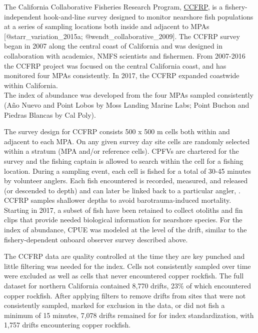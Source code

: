 \documentclass[11pt,
  letterpaper,
]{article}
\begin{document}
The California Collaborative Fisheries Research Program, \href{https://www.mlml.calstate.edu/ccfrp/}{CCFRP}, is a fishery-independent hook-and-line survey designed to monitor nearshore fish populations at a series of sampling locations both inside and adjacent to MPAs {[}@starr\_variation\_2015a; @wendt\_collaborative\_2009{]}. The CCFRP survey began in 2007 along the central coast of California and was designed in collaboration with academics, NMFS scientists and fishermen. From 2007-2016 the CCFRP project was focused on the central California coast, and has monitored four MPAs consistently. In 2017, the CCFRP expanded coastwide within California.\\
The index of abundance was developed from the four MPAs sampled consistently (Año Nuevo and Point Lobos by Moss Landing Marine Labs; Point Buchon and Piedras Blancas by Cal Poly).

The survey design for CCFRP consists 500 x 500 m cells both within and adjacent to each MPA. On any given survey day site cells are randomly selected within a stratum (MPA and/or reference cells). CPFVs are chartered for the survey and the fishing captain is allowed to search within the cell for a fishing location. During a sampling event, each cell is fished for a total of 30-45 minutes by volunteer anglers. Each fish encountered is recorded, measured, and released (or descended to depth) and can later be linked back to a particular angler, . CCFRP samples shallower depths to avoid barotrauma-induced mortality.\\
Starting in 2017, a subset of fish have been retained to collect otoliths and fin clips that provide needed biological information for nearshore species. For the index of abundance, CPUE was modeled at the level of the drift, similar to the fishery-dependent onboard observer survey described above.

The CCFRP data are quality controlled at the time they are key punched and little filtering was needed for the index. Cells not consistently sampled over time were excluded as well as cells that never encountered copper rockfish. The full dataset for northern California contained 8,770 drifts, 23\% of which encountered copper rockfish. After applying filters to remove drifts from sites that were not consistently sampled, marked for exclusion in the data, or did not fish a minimum of 15 minutes, 7,078 drifts remained for for index standardization, with 1,757 drifts encountering copper rockfish.
\end{document}
